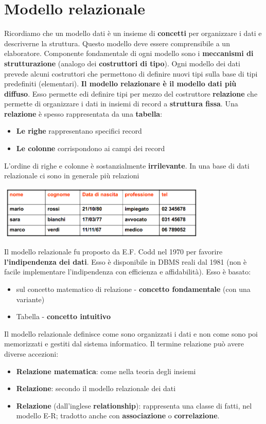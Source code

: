 \documentclass[12pt]{article}
\begin{document}
\section{Modello relazionale}
Ricordiamo che un modello dati è un insieme di \textbf{concetti} per organizzare i dati e descriverne la struttura.
Questo modello deve essere comprensibile a un elaboratore.
Componente fondamentale di ogni modello sono i \textbf{meccanismi di strutturazione} (analogo dei \textbf{costruttori di tipo}).
Ogni modello dei dati prevede alcuni costruttori che permettono di definire nuovi tipi sulla base di tipi predefiniti (elementari).
\textbf{Il modello relazionare è il modello dati più diffuso}.
Esso permette edi definire tipi per mezzo del costruttore \textbf{relazione} che permette di organizzare i dati in insiemi di record a \textbf{struttura fissa}.
Una \textbf{relazione} è spesso rappresentata da una \textbf{tabella}:
\begin{itemize}
    \item \textbf{Le righe} rappresentano specifici record
    \item \textbf{Le colonne} corrispondono ai campi dei record
\end{itemize}
L'ordine di righe e colonne è sostanzialmente \textbf{irrilevante}.
In una base di dati relazionale ci sono in generale più relazioni
\begin{center}
    \includegraphics[width = 0.75\textwidth]{Images/75.PNG}
\end{center}
Il modello relazionale fu proposto da E.F. Codd nel 1970 per favorire \textbf{l'indipendenza dei dati}.
Esso è disponibile in DBMS reali dal 1981 (non è facile implementare l'indipendenza con efficienza e affidabilità).
Esso è basato:
\begin{itemize}
    \item sul concetto matematico di relazione - \textbf{concetto fondamentale} (con una variante)
    \item Tabella - \textbf{concetto intuitivo}
\end{itemize}
Il modello relazionale definisce come sono organizzati i dati e non come sono poi memorizzati e gestiti dal sistema informatico.
Il termine relazione può avere diverse accezioni:
\begin{itemize}
    \item \textbf{Relazione matematica}: come nella teoria degli insiemi
    \item \textbf{Relazione}: secondo il modello relazionale dei dati
    \item \textbf{Relazione} (dall'inglese \textbf{relationship}): rappresenta una classe di fatti, nel modello E-R; tradotto anche con \textbf{associazione} o \textbf{correlazione}.
\end{itemize}
\end{document}
